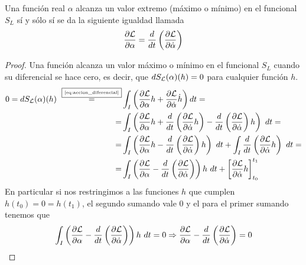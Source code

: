 \begin{theorem}
	Una función real $\alpha$ alcanza un valor extremo (máximo o mínimo) en el funcional $S_L$ sí y sólo sí se da la siguiente igualdad llamada 
	\begin{equation}
		\label{eq:euler-lagrange}
		\frac{\partial \mathcal{L}}{\partial \alpha}=\frac{d}{dt}\left( \frac{\partial \mathcal{L}}{\partial \dot{\alpha}} \right)
	\end{equation}
\end{theorem}
\begin{proof}
	Una función alcanza un valor máximo o mínimo en el funcional $S_L$ cuando su diferencial se hace cero, es decir, que $dS_{\mathcal{L}}(\alpha)(h)=0$ para cualquier función $h$.
	\begin{equation*}
		\begin{split}
			0 = dS_{\mathcal{L}}(\alpha)(h)~\overset{\fbox{\tiny \ref{eq:accion_diferencial}}}{=}&\int_{I}\left( \frac{\partial \mathcal{L}}{\partial\alpha}h+\frac{\partial \mathcal{L}}{\partial\dot{\alpha}}\dot{h}\right) dt =\\
			= & \int_{I}\left( \frac{\partial \mathcal{L}}{\partial\alpha}h+\frac{d}{dt}\left( \frac{\partial \mathcal{L}}{\partial \dot{\alpha}}h \right)-\frac{d}{dt}\left( \frac{\partial \mathcal{L}}{\partial \dot{\alpha}} \right)h\right)\ dt = \\
			= & \int_{I}\left( \frac{\partial \mathcal{L}}{\partial \alpha}h-\frac{d}{dt}\left( \frac{\partial \mathcal{L}}{\partial \dot{\alpha}} \right)h\right)\ dt +\int_{I}\frac{d}{dt}\left( \frac{\partial \mathcal{L}}{\partial \dot{\alpha}}h \right)\ dt = \\
			= & \int_I\left( \frac{\partial \mathcal{L}}{\partial \alpha}-\frac{d}{dt}\left( \frac{\partial \mathcal{L}}{\partial \dot{\alpha}} \right)\right)h\ dt + \left[ \frac{\partial \mathcal{L}}{\partial \dot{\alpha}}h \right]_{t_0}^{t_1}
		\end{split}
	\end{equation*}
	En particular si nos restringimos a las funciones $h$ que cumplen $h(t_0)=0=h(t_1)$, el segundo sumando vale $0$ y el para el primer sumando tenemos que
	\begin{equation*}
		\int_{I}\left( \frac{\partial \mathcal{L}}{\partial \alpha}-\frac{d}{dt}\left( \frac{\partial \mathcal{L}}{\partial \dot{\alpha}} \right)\right)h\ dt = 0 \Rightarrow \frac{\partial \mathcal{L}}{\partial \alpha}-\frac{d}{dt}\left( \frac{\partial \mathcal{L}}{\partial \dot{\alpha}} \right) = 0
	\end{equation*}
\end{proof}

